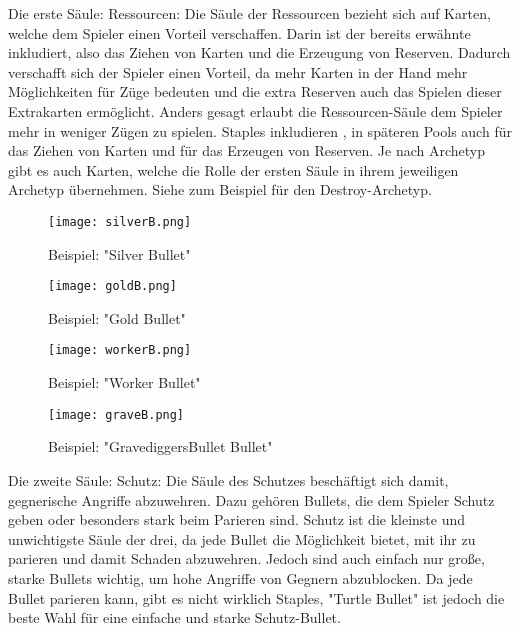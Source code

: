 Die erste Säule: Ressourcen:
Die Säule der Ressourcen bezieht sich auf Karten, welche dem Spieler einen Vorteil verschaffen. Darin ist der bereits
erwähnte  inkludiert, also das Ziehen von Karten und die Erzeugung von Reserven. Dadurch verschafft sich der Spieler einen Vorteil,
da mehr Karten in der Hand mehr Möglichkeiten für Züge bedeuten und die extra Reserven auch das Spielen dieser Extrakarten ermöglicht.
Anders gesagt erlaubt die Ressourcen-Säule dem Spieler mehr in weniger Zügen zu spielen.
Staples inkludieren , in späteren Pools auch  für das Ziehen von Karten und  für das Erzeugen von Reserven.
Je nach Archetyp gibt es auch Karten, welche die Rolle der ersten Säule in ihrem jeweiligen Archetyp übernehmen.
Siehe zum Beispiel  für den Destroy-Archetyp.

\begin{figure}[H]
    \centering
    \texttt{[image: silverB.png]}
    \caption{Beispiel: "Silver Bullet"}
\end{figure}

\begin{figure}[H]
    \centering
    \texttt{[image: goldB.png]}
    \caption{Beispiel: "Gold Bullet"}
\end{figure}

\begin{figure}[H]
    \centering
    \texttt{[image: workerB.png]}
    \caption{Beispiel: "Worker Bullet"}
\end{figure}

\begin{figure}[H]
    \centering
    \texttt{[image: graveB.png]}
    \caption{Beispiel: "GravediggersBullet Bullet"}
\end{figure}


Die zweite Säule: Schutz:
Die Säule des Schutzes beschäftigt sich damit, gegnerische Angriffe abzuwehren. Dazu gehören Bullets, die dem Spieler
Schutz geben oder besonders stark beim Parieren sind. Schutz ist die kleinste und unwichtigste Säule der drei,
da jede Bullet die Möglichkeit bietet, mit ihr zu parieren und damit Schaden abzuwehren. Jedoch sind auch einfach nur große,
starke Bullets wichtig, um hohe Angriffe von Gegnern abzublocken. Da jede Bullet parieren kann, gibt es nicht wirklich Staples,
"Turtle Bullet" ist jedoch die beste Wahl für eine einfache und starke Schutz-Bullet.

